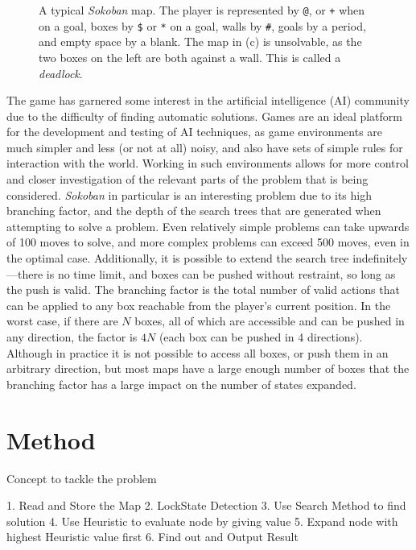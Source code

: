 \documentclass[a4paper,11pt]{article}
\begin{document}
\begin{figure}
  \caption{A typical \emph{Sokoban} map. The player is represented by \texttt{@}, or \texttt{+} when on a goal, boxes by \texttt{\$} or \texttt{*} on a goal, walls by \texttt{\#}, goals by a period, and empty space by a blank. The map in (c) is unsolvable, as the two boxes on the left are both against a wall. This is called a \emph{deadlock}.}
  \label{fig:mapex}
\end{figure}

The game has garnered some interest in the artificial intelligence (AI) community due to the difficulty of finding automatic solutions. Games are an ideal platform for the development and testing of AI techniques, as game environments are much simpler and less (or not at all) noisy, and also have sets of simple rules for interaction with the world. Working in such environments allows for more control and closer investigation of the relevant parts of the problem that is being considered. \emph{Sokoban} in particular is an interesting problem due to its high branching factor, and the depth of the search trees that are generated when attempting to solve a problem. Even relatively simple problems can take upwards of 100 moves to solve, and more complex problems can exceed 500 moves, even in the optimal case. Additionally, it is possible to extend the search tree indefinitely---there is no time limit, and boxes can be pushed without restraint, so long as the push is valid. The branching factor is the total number of valid actions that can be applied to any box reachable from the player's current position. In the worst case, if there are $N$ boxes, all of which are accessible and can be pushed in any direction, the factor is $4N$ (each box can be pushed in 4 directions). Although in practice it is not possible to access all boxes, or push them in an arbitrary direction, but most maps have a large enough number of boxes that the branching factor has a large impact on the number of states expanded.

\section{Method}

Concept to tackle the problem

1. Read and Store the Map
2. LockState Detection 
3. Use Search Method to find solution
4. Use Heuristic to evaluate node by giving value
5. Expand node with highest Heuristic value first
6. Find out and Output Result
\end{document}
